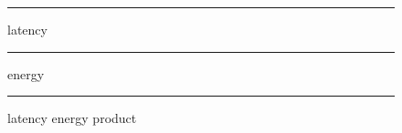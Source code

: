 \documentclass[12pt]{article}
\theoremstyle{definition}
\begin{document}
\begin{figure}[htb]
  \centering
  \begin{subfigure} {\texttt{[image: latency\_benchmark.png]}} \end{subfigure}
  \rule{\linewidth}{1pt}
  \caption{latency}
  \label{fig:latency_benchmark}
\end{figure}

\begin{figure}[htb]
  \centering
  \begin{subfigure} {\texttt{[image: energy\_benchmark.png]}} \end{subfigure}
  \rule{\linewidth}{1pt}
  \caption{energy}
  \label{fig:energy_benchmark}
\end{figure}

\begin{figure}[htb]
  \centering
  \begin{subfigure} {\texttt{[image: latency\_energy\_product\_benchmark.png]}} \end{subfigure}
  \rule{\linewidth}{1pt}
  \caption{latency energy product}
  \label{fig:latency_energy_product_benchmark}
\end{figure}


\end{document}
